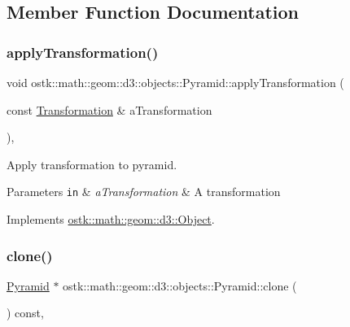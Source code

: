 \subsection{Member Function Documentation}
\mbox{\label{classostk_1_1math_1_1geom_1_1d3_1_1objects_1_1_pyramid_ab4f31049019c0ea4b87931adf4ba7c5d}} 
\subsubsection{\texorpdfstring{apply\+Transformation()}{applyTransformation()}}
{\footnotesize\ttfamily void ostk\+::math\+::geom\+::d3\+::objects\+::\+Pyramid\+::apply\+Transformation (\begin{DoxyParamCaption}\item[{const \hyperlink{classostk_1_1math_1_1geom_1_1d3_1_1_transformation}{Transformation} \&}]{a\+Transformation }\end{DoxyParamCaption})\hspace{0.3cm}{\ttfamily [override]}, {\ttfamily [virtual]}}



Apply transformation to pyramid. 


\begin{DoxyParams}[1]{Parameters}
\mbox{\tt in}  & {\em a\+Transformation} & A transformation \\
\hline
\end{DoxyParams}


Implements \hyperlink{classostk_1_1math_1_1geom_1_1d3_1_1_object_ae9194dd6d2bb4df09292ffc84dccdb1d}{ostk\+::math\+::geom\+::d3\+::\+Object}.

\mbox{\label{classostk_1_1math_1_1geom_1_1d3_1_1objects_1_1_pyramid_aefdaacc9298ef9d9a26137b2976f7dc6}} 
\subsubsection{\texorpdfstring{clone()}{clone()}}
{\footnotesize\ttfamily \hyperlink{classostk_1_1math_1_1geom_1_1d3_1_1objects_1_1_pyramid}{Pyramid} $\ast$ ostk\+::math\+::geom\+::d3\+::objects\+::\+Pyramid\+::clone (\begin{DoxyParamCaption}{ }\end{DoxyParamCaption}) const\hspace{0.3cm}{\ttfamily [override]}, {\ttfamily [virtual]}}



